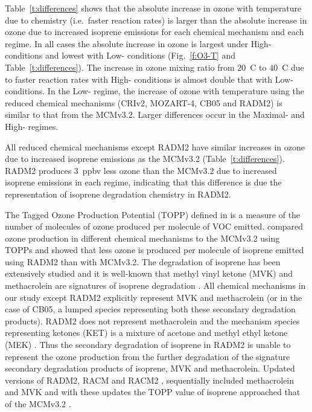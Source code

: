 Table~\ref{t:differences} shows that the absolute increase in ozone with temperature due to chemistry (i.e.~faster reaction rates) is larger than the absolute increase in ozone due to increased isoprene emissions for each chemical mechanism and each  regime.
In all cases the absolute increase in ozone is largest under High- conditions and lowest with Low- conditions (Fig.~\ref{f:O3-T} and Table~\ref{t:differences}).
The increase in ozone mixing ratio from $20$~\degree C to $40$~\degree C due to faster reaction rates with High- conditions is almost double that with Low- conditions.  
In the Low- regime, the increase of ozone with temperature using the reduced chemical mechanisms (CRIv2, MOZART-4, CB05 and RADM2) is similar to that from the MCMv3.2. 
Larger differences occur in the Maximal- and High- regimes.

All reduced chemical mechanisms except RADM2 have similar increases in ozone due to increased isoprene emissions as the MCMv3.2 (Table~\ref{t:differences}).
RADM2 produces $3$~ppbv less ozone than the MCMv3.2 due to increased isoprene emissions in each  regime, indicating that this difference is due the representation of isoprene degradation chemistry in RADM2.

The Tagged Ozone Production Potential (TOPP) defined in \citet{Butler:2011} is a measure of the number of molecules of ozone produced per molecule of VOC emitted.
\citet{Coates:2015} compared ozone production in different chemical mechanisms to the MCMv3.2 using TOPPs and showed that less ozone is produced per molecule of isoprene emitted using RADM2 than with MCMv3.2.
The degradation of isoprene has been extensively studied and it is well-known that methyl vinyl ketone (MVK) and methacrolein are signatures of isoprene degradation \citep{Atkinson:2000}.
All chemical mechanisms in our study except RADM2 explicitly represent MVK and methacrolein (or in the case of CB05, a lumped species representing both these secondary degradation products).
RADM2 does not represent methacrolein and the mechanism species representing ketones (KET) is a mixture of acetone and methyl ethyl ketone (MEK) \citep{Stockwell:1990}. 
Thus the secondary degradation of isoprene in RADM2 is unable to represent the ozone production from the further degradation of the signature secondary degradation products of isoprene, MVK and methacrolein.
Updated versions of RADM2, RACM \citep{Stockwell:1997} and RACM2 \citep{Goliff:2013}, sequentially included methacrolein and MVK and with these updates the TOPP value of isoprene approached that of the MCMv3.2 \citep{Coates:2015}.

